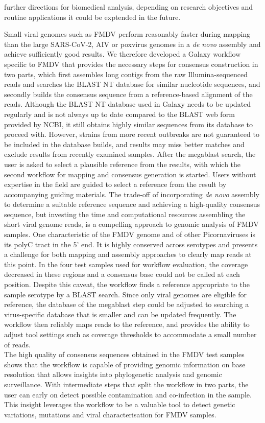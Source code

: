 further directions for biomedical analysis, depending on research objectives and routine applications it could be exptended in the future. 

Small viral genomes such as \ac{FMDV} perform reasonably faster during mapping than the large \ac{SARS-CoV-2}, \ac{AIV} or poxvirus genomes in a \textit{de novo} assembly and achieve sufficiently good results. We therefore developed a Galaxy workflow specific to \ac{FMDV} that provides the necessary steps for consensus construction in two parts, which first assembles long contigs from the raw Illumina-sequenced reads and searches the \ac{BLAST} NT database for similar nucleotide sequences, and secondly builds the consensus sequence from a reference-based alignment of the reads. Although the \ac{BLAST} NT database used in Galaxy needs to be updated regularly and is not always up to date compared to the \ac{BLAST} web form provided by \ac{NCBI}, it still obtains highly similar sequences from its database to proceed with. However, strains from more recent outbreaks are not guaranteed to be included in the database builds, and results may miss better matches and exclude results from recently examined samples. After the megablast search, the user is asked to select a plausible reference from the results, with which the second workflow for mapping and consensus generation is started. Users without expertise in the field are guided to select a reference from the result by accompanying guiding materials. The trade-off of incorporating \textit{de novo} assembly to determine a suitable reference sequence and achieving a high-quality consensus sequence, but investing the time and computational resources assembling the short viral genome reads, is a compelling approach to genomic analysis of \ac{FMDV} samples. One characteristic of the \ac{FMDV} genome and of other Picornaviruses is its polyC tract in the 5' end. It is highly conserved across serotypes and presents a challenge for both mapping and assembly approaches to clearly map reads at this point. In the four test samples used for workflow evaluation, the coverage decreased in these regions and a consensus base could not be called at each position. Despite this caveat, the workflow finds a reference appropriate to the sample serotype by a \ac{BLAST} search. Since only viral genomes are eligible for reference, the database of the megablast step could be adjusted to searching a virus-specific database that is smaller and can be updated frequently. The workflow then reliably maps reads to the reference, and provides the ability to adjust tool settings such as coverage thresholds to accommodate a small number of reads.\\
The high quality of consensus sequences obtained in the \ac{FMDV} test samples shows that the workflow is capable of providing genomic information on base resolution that allows insights into phylogenetic analysis and genomic surveillance. With intermediate steps that split the workflow in two parts, the user can early on detect possible contamination and co-infection in the sample. This insight leverages the workflow to be a valuable tool to detect genetic variations, mutations and viral characterisation for \ac{FMDV} samples.


